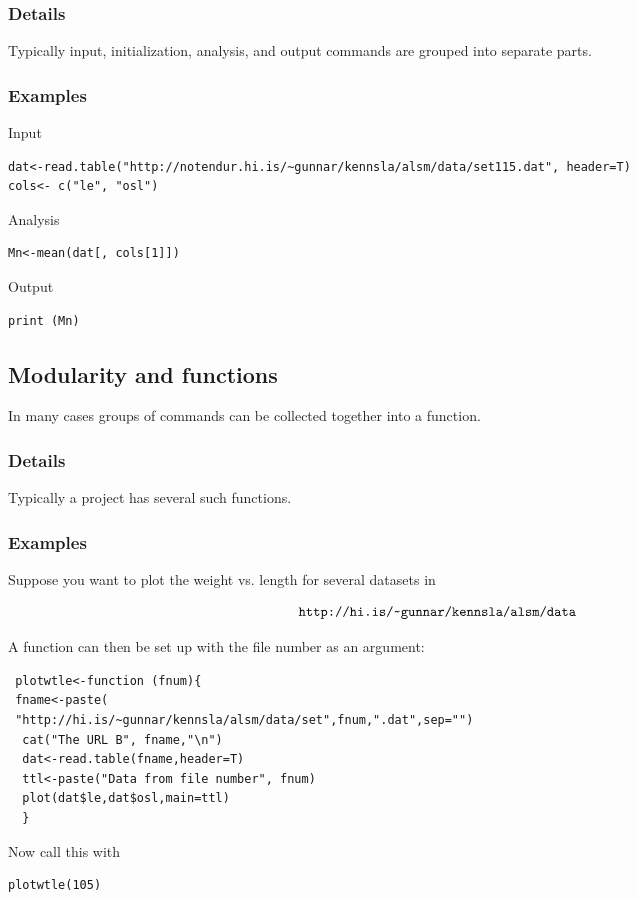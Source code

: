 \documentclass[12pt,a4paper]{article}
\theoremstyle{regla}
\theoremstyle{remark}
\theoremstyle{definition}
\theoremstyle{nonumberbreak}
\begin{document}
\subsubsection{Details}
Typically input, initialization, analysis, and output commands are grouped into separate parts.
\subsubsection{Examples}
\begin{xmpl}
Input
\begin{lstlisting}
dat<-read.table("http://notendur.hi.is/~gunnar/kennsla/alsm/data/set115.dat", header=T)
cols<- c("le", "osl")
\end{lstlisting}

Analysis
\begin{lstlisting}
Mn<-mean(dat[, cols[1]])
\end{lstlisting}


Output
\begin{lstlisting}
print (Mn)
\end{lstlisting}
\end{xmpl}

\subsection{Modularity and functions}
\begin{fbox}
\begin{minipage}{0.97\textwidth}
In many cases groups of commands can be collected together into a function. 
\end{minipage}
\end{fbox}
\subsubsection{Details}
Typically a project has several such functions.
\subsubsection{Examples}
\begin{xmpl}

Suppose you want to plot the weight vs. length for several datasets in

$$\verb|http://hi.is/~gunnar/kennsla/alsm/data|$$

A function can then be set up with the file number as an argument:
\begin{lstlisting}
 plotwtle<-function (fnum){
 fname<-paste(
 "http://hi.is/~gunnar/kennsla/alsm/data/set",fnum,".dat",sep="")
  cat("The URL B", fname,"\n")
  dat<-read.table(fname,header=T)
  ttl<-paste("Data from file number", fnum)
  plot(dat$le,dat$osl,main=ttl)
  }
\end{lstlisting}

Now call this with
\begin{lstlisting}
plotwtle(105)
\end{lstlisting}
\end{xmpl}
\end{document}
